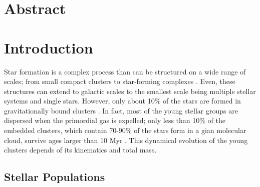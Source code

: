 \documentclass[12pt]{article}
\providecommand\phantomsection{} %
\begin{document}
\newpage
\phantomsection
{}
\section*{\centering Abstract}

\newpage
{}


\section{Introduction}
\label{sec:introduction}

Star formation is a complex process than can be structured on a wide range of scales; from small compact clusters to star-forming complexes \citep{Larson1994,Elmegreen-Efremov1996,Bonnell2011}. Even, these structures can extend to galactic scales \citep{Efremov2015} to the smallest scale being multiple stellar systems and single stars. However, only about 10\% of the stars are formed in gravitationally bound clusters \citep[e.g. ][]{Schweizer2009,Ward-Kruijssen2018}. In fact, most of the young stellar groups are dispersed when the primordial gas is expelled; only less than 10\% of the embedded clusters, which contain 70-90\% of the stars form in a gian molecular cloud, survive ages larger than 10 Myr \citep{Lada-Lada2003,Bonatto-Bica2011}. This dynamical evolution of the young clusters depends of its kinematics and total mass.

\subsection{Stellar Populations}
\label{sec:populations}
\end{document}
